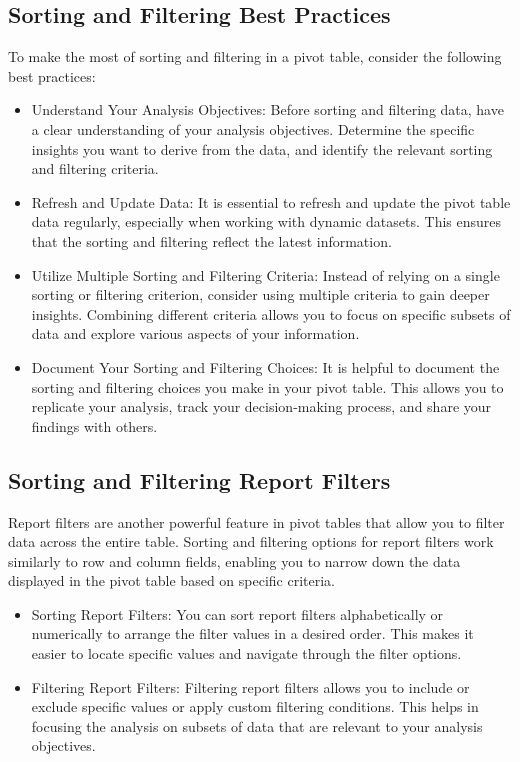 \documentclass[
]{book}
\begin{document}
\hypertarget{sorting-and-filtering-best-practices}{%
\subsection{Sorting and Filtering Best Practices}\label{sorting-and-filtering-best-practices}}

To make the most of sorting and filtering in a pivot table, consider the following best practices:

\begin{itemize}
\item
  Understand Your Analysis Objectives: Before sorting and filtering data, have a clear understanding of your analysis objectives. Determine the specific insights you want to derive from the data, and identify the relevant sorting and filtering criteria.
\item
  Refresh and Update Data: It is essential to refresh and update the pivot table data regularly, especially when working with dynamic datasets. This ensures that the sorting and filtering reflect the latest information.
\item
  Utilize Multiple Sorting and Filtering Criteria: Instead of relying on a single sorting or filtering criterion, consider using multiple criteria to gain deeper insights. Combining different criteria allows you to focus on specific subsets of data and explore various aspects of your information.
\item
  Document Your Sorting and Filtering Choices: It is helpful to document the sorting and filtering choices you make in your pivot table. This allows you to replicate your analysis, track your decision-making process, and share your findings with others.
\end{itemize}

\hypertarget{sorting-and-filtering-report-filters}{%
\subsection{Sorting and Filtering Report Filters}\label{sorting-and-filtering-report-filters}}

Report filters are another powerful feature in pivot tables that allow you to filter data across the entire table. Sorting and filtering options for report filters work similarly to row and column fields, enabling you to narrow down the data displayed in the pivot table based on specific criteria.

\begin{itemize}
\item
  Sorting Report Filters: You can sort report filters alphabetically or numerically to arrange the filter values in a desired order. This makes it easier to locate specific values and navigate through the filter options.
\item
  Filtering Report Filters: Filtering report filters allows you to include or exclude specific values or apply custom filtering conditions. This helps in focusing the analysis on subsets of data that are relevant to your analysis objectives.
\end{itemize}
\end{document}
